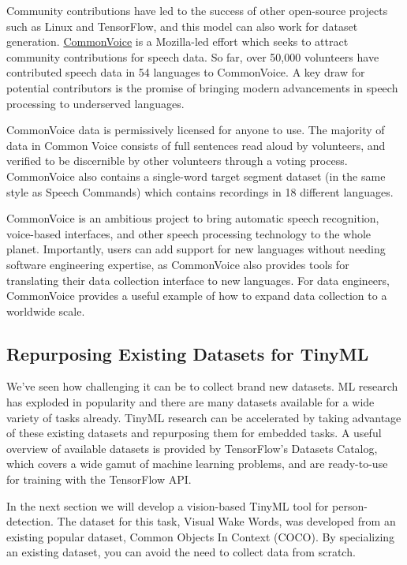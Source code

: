     Community contributions have led to the success of other open-source projects such as Linux and TensorFlow, and this model can also work for dataset generation. \href{https://commonvoice.mozilla.org/en}{CommonVoice} is a Mozilla-led effort which seeks to attract community contributions for speech data. So far, over 50,000 volunteers have contributed speech data in 54 languages to CommonVoice. A key draw for potential contributors is the promise of bringing modern advancements in speech processing to underserved languages. 
    
    CommonVoice data is permissively licensed for anyone to use. The majority of data in Common Voice consists of full sentences read aloud by volunteers, and verified to be discernible by other volunteers through a voting process. CommonVoice also contains a single-word target segment dataset (in the same style as Speech Commands) which contains recordings in 18 different languages. 
    
    CommonVoice is an ambitious project to bring automatic speech recognition, voice-based interfaces, and other speech processing technology to the whole planet. Importantly, users can add support for new languages without needing software engineering expertise, as CommonVoice also provides tools for translating their data collection interface to new languages. For data engineers, CommonVoice provides a useful example of how to expand data collection to a worldwide scale.
    
\subsection{Repurposing Existing Datasets for TinyML}

    We’ve seen how challenging it can be to collect brand new datasets. ML research has exploded in popularity and there are many datasets available for a wide variety of tasks already. TinyML research can be accelerated by taking advantage of these existing datasets and repurposing them for embedded tasks. A useful overview of available datasets is provided by TensorFlow’s Datasets Catalog, which covers a wide gamut of machine learning problems, and are ready-to-use for training with the TensorFlow API.
    
    In the next section we will develop a vision-based TinyML tool for person-detection. The dataset for this task, Visual Wake Words, was developed from an existing popular dataset, Common Objects In Context (COCO). By specializing an existing dataset, you can avoid the need to collect data from scratch.
    
